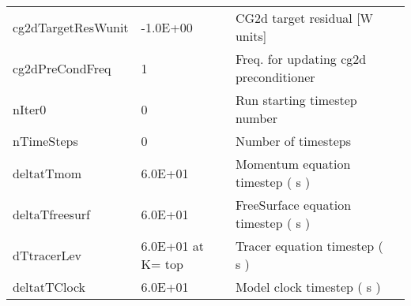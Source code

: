 \begin{table}
\begin{tabular}{lllc}
   cg2dTargetResWunit   &                  -1.0E+00
    &   CG2d target residual [W units] 
    &  %
    \\
   cg2dPreCondFreq   &                         1
    &   Freq. for updating cg2d preconditioner 
    &  %
    \\
   nIter0   &                         0
    &   Run starting timestep number  
    &  %
    \\
   nTimeSteps   &                         0
    &   Number of timesteps 
    &  %
    \\
   deltatTmom   &                   6.0E+01
    &   Momentum equation timestep ( s ) 
    &  %
    \\
   deltaTfreesurf   &                   6.0E+01
    &   FreeSurface equation timestep ( s ) 
    &  %
    \\
   dTtracerLev   &      6.0E+01 at K= top
    &   Tracer equation timestep ( s ) 
    &  %
    \\
   deltatTClock    &                   6.0E+01
    &   Model clock timestep ( s ) 
    &  %
    \\
\end{tabular}
\end{table}

